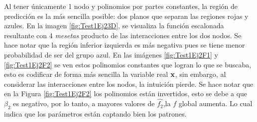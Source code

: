 \documentclass[../Main/Main.tex]{subfiles}
\begin{document}
Al tener únicamente 1 nodo y polinomios por partes constantes, la región de predicción es la más sencilla posible: dos planos que separan las regiones rojas y azules. En la imagen \ref{fig:Test1Ej23D}, se visualiza la función escalonada resultante con 4 \textit{mesetas} producto de las interacciones entre los dos nodos. Se hace notar que la región inferior izquierda es más negativa pues se tiene menor probabilidad de ser del grupo azul. En las imágenes \ref{fig:Test1Ej2F1} y \ref{fig:Test1Ej2F2} se ven estos polinomios constantes que logran lo que se buscaba, esto es codificar de forma más sencilla la variable real $\mathbf{x}$, sin embargo, al considerar las interacciones entre los nodos, la intuición pierde. Se hace notar que en la Figura \ref{fig:Test1Ej2F2} los polinomios están invertidos, esto se debe a que $\beta_2$ es negativo, por lo tanto, a mayores valores de $\hat{f_2}$,la $f$ global aumenta. Lo cual indica que los parámetros están captando bien los patrones.
\end{document}
